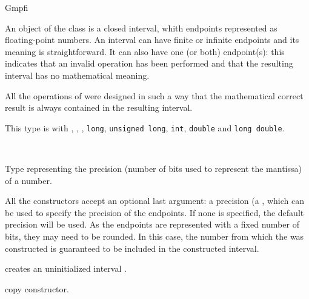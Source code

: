\begin{ccRefClass} {Gmpfi}
\label{Gmpfi}

\ccDefinition

An object of the class  is a closed interval, whith endpoints
represented as  floating-point numbers. An interval can have
finite or infinite endpoints and its meaning is straightforward. It can
also have one (or both)  endpoint(s): this indicates that an
invalid operation has been performed and that the resulting interval has no
mathematical meaning.

All the operations of  were designed in such a way that the
mathematical correct result is always contained in the resulting interval.

This type is  with , ,
, \verb-long-, \verb-unsigned long-, \verb-int-, \verb-double-
and \verb-long double-.


\ccIsModel
{}\\

\ccTypes

                {Type representing the precision (number of bits
                used to represent the mantissa) of a number.}

\ccCreation

All the constructors accept an optional last argument: a precision (a
, which can be used to specify the precision of the
 endpoints. If none is specified, the default precision will be
used. As the endpoints are represented with a fixed number of bits, they
may need to be rounded. In this case, the number from which the 
was constructed is guaranteed to be included in the constructed interval.


        {creates an uninitialized  interval \ccVar.}

\ccHidden {}
        {copy constructor.}



\end{ccRefClass}
